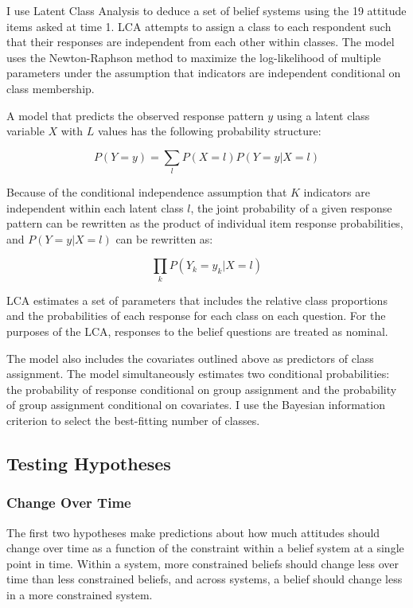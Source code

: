 \documentclass[12pt,]{article}
\begin{document}
I use Latent Class Analysis to deduce a set of belief systems using the 19 attitude items asked at time 1. LCA attempts to assign a class to each respondent such that their responses are independent from each other within classes. The model uses the Newton-Raphson method to maximize the log-likelihood of multiple parameters under the assumption that indicators are independent conditional on class membership.

A model that predicts the observed response pattern \(y\) using a latent class variable \(X\) with \(L\) values has the following probability structure:

\[ P(Y=y) = \sum_l P(X=l)P(Y=y|X=l)\]

Because of the conditional independence assumption that \(K\) indicators are independent within each latent class \(l\), the joint probability of a given response pattern can be rewritten as the product of individual item response probabilities, and \(P(Y=y|X=l)\) can be rewritten as:

\[\prod_{k}P(Y_k = y_k | X=l) \]

LCA estimates a set of parameters that includes the relative class proportions and the probabilities of each response for each class on each question. For the purposes of the LCA, responses to the belief questions are treated as nominal.

The model also includes the covariates outlined above as predictors of class assignment. The model simultaneously estimates two conditional probabilities: the probability of response conditional on group assignment and the probability of group assignment conditional on covariates. I use the Bayesian information criterion to select the best-fitting number of classes.

\hypertarget{testing-hypotheses}{%
\subsection{Testing Hypotheses}\label{testing-hypotheses}}

\hypertarget{change-over-time}{%
\subsubsection{Change Over Time}\label{change-over-time}}

The first two hypotheses make predictions about how much attitudes should change over time as a function of the constraint within a belief system at a single point in time. Within a system, more constrained beliefs should change less over time than less constrained beliefs, and across systems, a belief should change less in a more constrained system.
\end{document}
